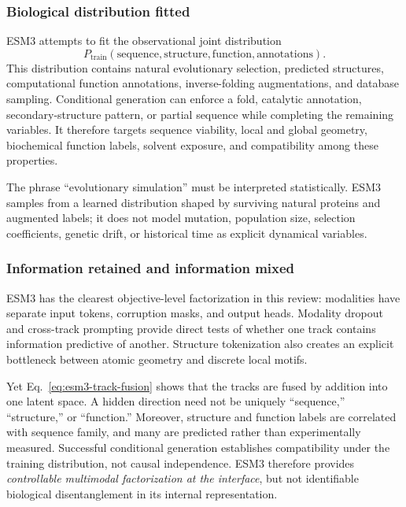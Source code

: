 \documentclass[10pt]{article}
\begin{document}
\subsubsection{Biological distribution fitted}

ESM3 attempts to fit the observational joint distribution
\begin{equation}
P_{\mathrm{train}}(
\text{sequence},\text{structure},\text{function},\text{annotations}).
\label{eq:esm3-joint-distribution}
\end{equation}
This distribution contains natural evolutionary selection, predicted structures, computational
function annotations, inverse-folding augmentations, and database sampling.  Conditional
generation can enforce a fold, catalytic annotation, secondary-structure pattern, or partial
sequence while completing the remaining variables.  It therefore targets sequence viability,
local and global geometry, biochemical function labels, solvent exposure, and compatibility among
these properties.

The phrase ``evolutionary simulation'' must be interpreted statistically.  ESM3 samples from a
learned distribution shaped by surviving natural proteins and augmented labels; it does not model
mutation, population size, selection coefficients, genetic drift, or historical time as explicit
dynamical variables.

\subsubsection{Information retained and information mixed}

ESM3 has the clearest objective-level factorization in this review: modalities have separate input
tokens, corruption masks, and output heads.  Modality dropout and cross-track prompting provide
direct tests of whether one track contains information predictive of another.  Structure
tokenization also creates an explicit bottleneck between atomic geometry and discrete local motifs.

Yet Eq.~\ref{eq:esm3-track-fusion} shows that the tracks are fused by addition into one latent
space.  A hidden direction need not be uniquely ``sequence,'' ``structure,'' or ``function.''
Moreover, structure and function labels are correlated with sequence family, and many are predicted
rather than experimentally measured.  Successful conditional generation establishes compatibility
under the training distribution, not causal independence.  ESM3 therefore provides
\emph{controllable multimodal factorization at the interface}, but not identifiable biological
disentanglement in its internal representation.
\end{document}
